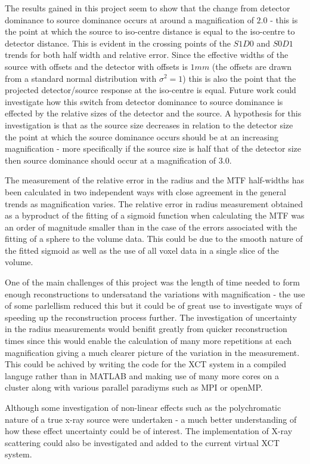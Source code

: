 \documentclass[
  twoside,
  11pt, a4paper,
  footinclude=true,
  headinclude=true,
  cleardoublepage=empty
]{scrbook}
\begin{document}
The results gained in this project seem to show that the change from detector dominance to source dominance occurs at around a magnification of $2.0$ - this is the point at which the source to iso-centre distance is equal to the iso-centre to detector distance. This is evident in the crossing points of the $S1D0$ and $S0D1$ trends for both half width and relative error. Since the effective widths of the source with offsets and the detector with offsets is $1mm$ (the offsets are drawn from a standard normal distribution with $\sigma^2 = 1$) this is also the point that the projected detector/source response at the iso-centre is equal. Future work could investigate how this switch from detector dominance to source dominance is effected by the relative sizes of the detector and the source. A hypothesis for this investigation is that as the source size decreases in relation to the detector size the point at which the source dominance occurs should be at an increasing magnification - more specifically if the source size is half that of the detector size then source dominance should occur at a magnification of $3.0$.

The measurement of the relative error in the radius and the MTF half-widths has been calculated in two independent ways with close agreement in the general trends as magnification varies. The relative error in radius measurement obtained as a byproduct of the fitting of a sigmoid function when calculating the MTF was an order of magnitude smaller than in the case of the errors associated with the fitting of a sphere to the volume data. This could be due to the smooth nature of the fitted sigmoid as well as the use of all voxel data in a single slice of the volume.

One of the main challenges of this project was the length of time needed to form enough reconstructions to undersatand the variations with magnification - the use of some parlellism reduced this but it could be of great use to investigate ways of speeding up the reconstruction process further. The investigation of uncertainty in the radius measurements would benifit greatly from quicker reconstruction times since this would enable the calculation of many more repetitions at each magnification giving a much clearer picture of the variation in the measurement. This could be achived by writing the code for the XCT system in a compiled languge rather than in MATLAB and making use of many more cores on a cluster along with various parallel paradiyms such as MPI or openMP.

Although some investigation of non-linear effects such as the polychromatic nature of a true x-ray source were undertaken - a much better understanding of how these effect uncertainty could be of interest. The implementation of X-ray scattering could also be investigated and added to the current virtual XCT system.









\end{document}
